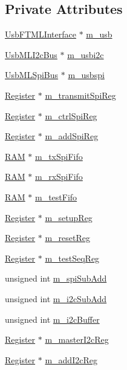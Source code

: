 \subsection*{Private Attributes}
\begin{DoxyCompactItemize}
\item 
\hyperlink{classUsbFTMLInterface}{Usb\+F\+T\+M\+L\+Interface} $\ast$ \hyperlink{classFePGA_afb7947e600a66d914ee524acec3d8b1f}{m\+\_\+usb}
\item 
\hyperlink{classUsbMLI2cBus}{Usb\+M\+L\+I2c\+Bus} $\ast$ \hyperlink{classFePGA_a09fdde4002008daa0d15672772dd4483}{m\+\_\+usbi2c}
\item 
\hyperlink{classUsbMLSpiBus}{Usb\+M\+L\+Spi\+Bus} $\ast$ \hyperlink{classFePGA_a922a56250b29c9842cdb8095cae8c976}{m\+\_\+usbspi}
\item 
\hyperlink{classRegister}{Register} $\ast$ \hyperlink{classFePGA_a003ee241fb5f32fb3442174db3fe6f49}{m\+\_\+transmit\+Spi\+Reg}
\item 
\hyperlink{classRegister}{Register} $\ast$ \hyperlink{classFePGA_a8fb76733a688dff6d91892a49a97a21f}{m\+\_\+ctrl\+Spi\+Reg}
\item 
\hyperlink{classRegister}{Register} $\ast$ \hyperlink{classFePGA_a569eb8410924bec1c8279ca80dc37a6a}{m\+\_\+add\+Spi\+Reg}
\item 
\hyperlink{classRAM}{R\+AM} $\ast$ \hyperlink{classFePGA_a5b3e4deb73a882e6f044450d8a733558}{m\+\_\+tx\+Spi\+Fifo}
\item 
\hyperlink{classRAM}{R\+AM} $\ast$ \hyperlink{classFePGA_a3ee7f973bfad39b48bbc1a185e9ffaec}{m\+\_\+rx\+Spi\+Fifo}
\item 
\hyperlink{classRAM}{R\+AM} $\ast$ \hyperlink{classFePGA_a97fc9347c90d9a31d99ccb499cc06eee}{m\+\_\+test\+Fifo}
\item 
\hyperlink{classRegister}{Register} $\ast$ \hyperlink{classFePGA_a0255fe229013986b4387c3a75ddf4e97}{m\+\_\+setup\+Reg}
\item 
\hyperlink{classRegister}{Register} $\ast$ \hyperlink{classFePGA_aeff1a2370237a06b50e1ae23d933c862}{m\+\_\+reset\+Reg}
\item 
\hyperlink{classRegister}{Register} $\ast$ \hyperlink{classFePGA_a67bc3c8f923b673100974fd86096393e}{m\+\_\+test\+Seq\+Reg}
\item 
unsigned int \hyperlink{classFePGA_a4f2f5d175aeb6dcaf497f81d2f075411}{m\+\_\+spi\+Sub\+Add}
\item 
unsigned int \hyperlink{classFePGA_aba8c2c8d8e0d136826b9dd4c2d7c2e90}{m\+\_\+i2c\+Sub\+Add}
\item 
unsigned int \hyperlink{classFePGA_a173664ffd6a73f454ae31f51e689dd16}{m\+\_\+i2c\+Buffer}
\item 
\hyperlink{classRegister}{Register} $\ast$ \hyperlink{classFePGA_adb390ea8de4a6cbce648dc62e4405f32}{m\+\_\+master\+I2c\+Reg}
\item 
\hyperlink{classRegister}{Register} $\ast$ \hyperlink{classFePGA_af3ef3467ba803e6d3b970ea8982d6246}{m\+\_\+add\+I2c\+Reg}
\end{DoxyCompactItemize}
